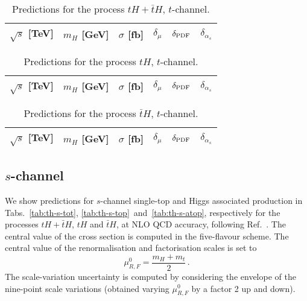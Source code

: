 \documentclass[a4paper,usenames,dvipsnames,11pt]{article}
\begin{document}
\begin{table}
    \centering
    \begin{tabular}{cccccc}
        $\sqrt{s}$ [TeV]  &  $m_H$ [GeV]  &  $\sigma$ [fb]  & $\delta_{\mu}$   &  $\delta_{\rm PDF}$   & $\delta_{\alpha_s}$\\
        \hline
    \end{tabular}
    \caption{\label{tab:th-t-tot} Predictions for the process $tH + \bar t H$, $t$-channel.}
\end{table}
%
\begin{table}
    \centering
    \begin{tabular}{cccccc}
        $\sqrt{s}$ [TeV]  &  $m_H$ [GeV]  &  $\sigma$ [fb]  & $\delta_{\mu}$   &  $\delta_{\rm PDF}$   & $\delta_{\alpha_s}$\\
        \hline
    \end{tabular}
    \caption{\label{tab:th-t-top} Predictions for the process $tH$, $t$-channel.}
\end{table}
%
\begin{table}
    \centering
    \begin{tabular}{cccccc}
        $\sqrt{s}$ [TeV]  &  $m_H$ [GeV]  &  $\sigma$ [fb]  & $\delta_{\mu}$   &  $\delta_{\rm PDF}$   & $\delta_{\alpha_s}$\\
        \hline
    \end{tabular}
    \caption{\label{tab:th-t-atop} Predictions for the process $\bar tH$, $t$-channel.}
\end{table}


\subsection{$s$-channel}
We show predictions for $s$-channel single-top and Higgs associated production in Tabs.~\ref{tab:th-s-tot}, \ref{tab:th-s-top}~and~\ref{tab:th-s-atop},
respectively for the processes $tH + \bar t H$, $tH$ and $\bar t H$, at NLO QCD accuracy, following Ref.~\cite{Demartin:2015uha}. The central 
value of the cross section is computed in the five-flavour scheme. 
The central value of the renormalisation and factorisation scales is set to
\begin{equation}
    \mu_{R,F}^0 = \frac{m_H+m_t}{2}\,.
\end{equation}
The scale-variation uncertainty is computed by considering the envelope of the 
nine-point scale variations (obtained varying $ \mu_{R,F}^0$ by a factor 2 up and down).
\end{document}
